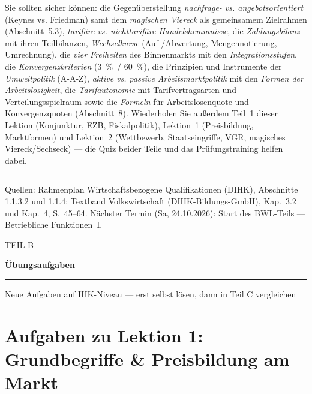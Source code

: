 \documentclass[11pt, a4paper]{article}
\begin{document}
\begin{merksatz}[title={\bfseries Wichtig für die Prüfungsvorbereitung (Block 1.1 komplett)}]
Sie sollten sicher können: die Gegenüberstellung \emph{nachfrage- vs. angebotsorientiert}
(Keynes vs. Friedman) samt dem \emph{magischen Viereck} als gemeinsamem Zielrahmen
(Abschnitt~5.3), \emph{tarifäre vs. nichttarifäre Handelshemmnisse}, die
\emph{Zahlungsbilanz} mit ihren Teilbilanzen, \emph{Wechselkurse} (Auf-/Abwertung,
Mengennotierung, Umrechnung), die \emph{vier Freiheiten} des Binnenmarkts mit den
\emph{Integrationsstufen}, die \emph{Konvergenzkriterien} (3~\%~/ 60~\%), die
Prinzipien und Instrumente der \emph{Umweltpolitik} (A-A-Z), \emph{aktive vs. passive
Arbeitsmarktpolitik} mit den \emph{Formen der Arbeitslosigkeit}, die
\emph{Tarifautonomie} mit Tarifvertragsarten und Verteilungsspielraum sowie die
\emph{Formeln} für Arbeitslosenquote und Konvergenzquoten (Abschnitt~8). Wiederholen Sie
außerdem Teil~1 dieser Lektion (Konjunktur, EZB, Fiskalpolitik),
Lektion~1 (Preisbildung, Marktformen) und Lektion~2 (Wettbewerb, Staatseingriffe, VGR,
magisches Viereck/Sechseck) --- die Quiz beider Teile und das Prüfungstraining helfen dabei.
\end{merksatz}

\vspace{1em}
\hrule
\vspace{0.8em}
\noindent\textsf{\small Quellen: Rahmenplan Wirtschaftsbezogene Qualifikationen (DIHK), Abschnitte 1.1.3.2 und 1.1.4;
Textband Volkswirtschaft (DIHK-Bildungs-GmbH), Kap.~3.2 und Kap.~4, S.~45--64. Nächster Termin (Sa, 24.10.2026):
Start des BWL-Teils --- Betriebliche Funktionen~I.}


\clearpage
{}
\vspace*{5cm}
{\bfwlabelfont\color{bfwPrimary}TEIL B\par}
\vspace{0.5em}
{\Huge\bfseries\color{bfwPrimaryDark}Übungsaufgaben\par}
\vspace{0.6em}
{\color{bfwPrimary}\rule{\linewidth}{2pt}}\par
\vspace{0.6em}
{\large\color{bfwInkSoft}Neue Aufgaben auf IHK-Niveau --- erst selbst lösen, dann in Teil C vergleichen\par}
\clearpage

\clearpage
\section*{Aufgaben zu Lektion 1: Grundbegriffe \& Preisbildung am Markt}

\clearpage
\end{document}
